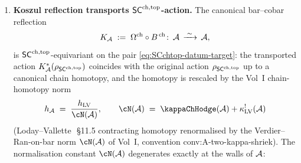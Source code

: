 \begin{proposition}
\begin{enumerate}[label=\textup{(\alph*)}]
\begin{equation}
{{ $\SCchtop$-action on $(Z^{\mathrm{der}}_{\mathrm{ch}}(\cA),\cA)$
 computed from $F$ agrees, under the named equivalence
 $F\leftrightarrow(2)$, with the
 action~\eqref{eq:bar-coalg-mc} transported through the
 adjunction $\Omega^{\mathrm{ch}}\dashv B^{\,\mathrm{ch}}$
 and the Koszul duality
 \eqref{eq:endch-bar-cobar}.}}
\end{equation}
The closed colour computes through Voronov's half-plane
model $\FM_k(\mathbb{H})$ of the Swiss-cheese operad
(\cite{Voronov1998}\,\S2, with the $E_1$-chiral enrichment of
Hoefel--Livernet~\cite{HL12}\,Theorem~3.1); the
factorisation face matches Costello--Gwilliam
Vol~II~\cite{CG21}\,Theorem~7.3.7 bulk--boundary restriction
on $X\times\R_{\geq 0}$; the Koszul-dual face is the
$L_\infty$-convolution datum of Vallette~\cite{Val07}; the
Drinfeld-centre face is the $\infty$-categorical centre of
$\Rep_{\mathrm{fact}}(\cA)$ in the sense of Lurie
HA~5.3.1.30~\cite{LurieHA}; the derived-algebraic-geometry face
is the $1$-shifted symplectic structure on the mapping stack
$\bMap(X, \mathcal{M}_{\SCchtop})$ in the sense of
PTVV~\cite{PTVV13}\,Theorem~2.5; the mixed bulk-to-boundary sector
matches the Dimofte slab trace~\cite{Dimofte25}. All seven
projections factor through
$B^{\,\mathrm{ch}}(\cA)$ as the unique cofibrant replacement of
$\cA$ in the operadic model structure on
$E_1\text{-chiralAlg}_X$ (Hinich~\cite{Hinich97}\,Theorem~4.7.4).
\item \textbf{Koszul reflection transports $\mathsf{SC}^{\mathrm{ch},\mathrm{top}}$-action.}
The canonical bar--cobar reflection
\begin{equation}\label{eq:koszul-reflection-SC}
 K_{\mathcal{A}}\;:=\;\Omega^{\mathrm{ch}}\circ B^{\,\mathrm{ch}}\colon
 \,\mathcal{A}\,\xrightarrow{\;\sim\;}\,\mathcal{A},
\end{equation}
is $\mathsf{SC}^{\mathrm{ch},\mathrm{top}}$-equivariant on the pair
\eqref{eq:SCchtop-datum-target}: the transported action
$K_{\mathcal{A}}^\ast(\rho_{\mathsf{SC}^{\mathrm{ch},\mathrm{top}}})$ coincides with the original
action $\rho_{\mathsf{SC}^{\mathrm{ch},\mathrm{top}}}$ up to a canonical chain homotopy,
and the homotopy is rescaled by the Vol~I chain-homotopy norm
\begin{equation}\label{eq:chain-homotopy-normalisation}
 h_\cA
 \;=\;
 \frac{h_{\mathrm{LV}}}{\cN(\cA)},
 \qquad
 \cN(\cA) \;=\; \kappaChHodge(\cA)+\kappa^{!}_{\mathrm{LV}}(\cA)
\end{equation}
(Loday--Vallette~\cite{LV12}\,\S11.5 contracting homotopy
renormalised by the Verdier--Ran-on-bar norm $\cN(\cA)$ of Vol~I,
convention \textsf{conv:A-two-kappa-shriek}). The normalisation
constant $\cN(\cA)$ degenerates exactly at the walls of $\cA$:

\end{enumerate}
\end{proposition}
